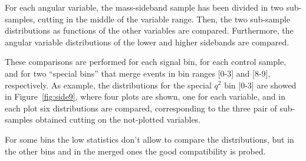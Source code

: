 For each angular variable, the mass-sideband sample has been divided in two sub-samples, cutting in the middle of the variable range.
Then, the two sub-sample distributions as functions of the other variables are compared.
Furthermore, the angular variable distributions of the lower and higher sidebands are compared.

These comparisons are performed for each signal bin, for each control sample, and for two ``special bins'' that merge events in bin ranges [0-3] and [8-9], respectively.
As example, the distributions for the special $q^2$ bin [0-3] are showed in Figure~\ref{fig:side9}, where four plots are shown, one for each variable, and in each plot six distributions are compared, corresponding to the three pair of sub-samples obtained cutting on the not-plotted variables.

For some bins the low statistics don't allow to compare the distributions, but in the other bins and in the merged ones the good compatibility is probed.



